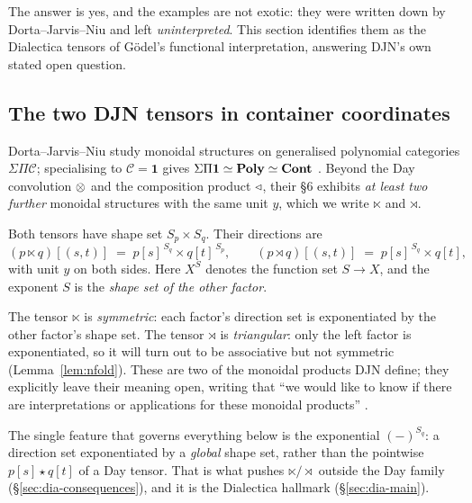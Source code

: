 The answer is yes, and the examples are not exotic: they were written down by
Dorta--Jarvis--Niu \cite{djn2305} and left \emph{uninterpreted}. This section
identifies them as the Dialectica tensors of Gödel's functional interpretation,
answering DJN's own stated open question.

\subsection{The two DJN tensors in container coordinates}
\label{sec:dia-def}

Dorta--Jarvis--Niu study monoidal structures on generalised polynomial
categories $\Sigma\Pi\mathcal C$; specialising to $\mathcal C=\mathbf 1$ gives
$\Sigma\Pi\mathbf 1\simeq\mathbf{Poly}\simeq\mathbf{Cont}$ \cite[Prop.~2.9]{djn2305}. Beyond the
Day convolution $\mathbin{\otimes}$ and the composition product $\mathbin{\triangleleft}$, their \S6 exhibits
\emph{at least two further} monoidal structures with the same unit $y$, which we
write $\ltimes$ and $\rtimes$.

\begin{Definition}
\label{def:dia-tensors}
Both tensors have shape set $S_p\times S_q$. Their directions are
\[
  (p\ltimes q)[(s,t)] \;=\; p[s]^{\,S_q}\times q[t]^{\,S_p},
  \qquad
  (p\rtimes q)[(s,t)] \;=\; p[s]^{\,S_q}\times q[t],
\]
with unit $y$ on both sides. Here $X^{S}$ denotes the function set $S\to X$, and
the exponent $S$ is the \emph{shape set of the other factor}.
\end{Definition}

The tensor $\ltimes$ is \emph{symmetric}: each factor's direction set is
exponentiated by the other factor's shape set. The tensor $\rtimes$ is
\emph{triangular}: only the left factor is exponentiated, so it will turn out to
be associative but not symmetric (Lemma~\ref{lem:nfold}). These are two of the
monoidal products DJN define; they explicitly leave their meaning open, writing
that ``we would like to know if there are interpretations or applications for
these monoidal products'' \cite{djn2305}.

The single feature that governs everything below is the exponential
$(-)^{S_q}$: a direction set exponentiated by a \emph{global} shape set, rather
than the pointwise $p[s]\star q[t]$ of a Day tensor. That is what pushes
$\ltimes/\rtimes$ outside the Day family (§\ref{sec:dia-consequences}), and it
is the Dialectica hallmark (§\ref{sec:dia-main}).


